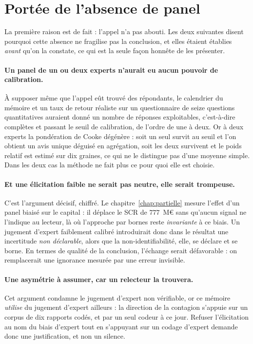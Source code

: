 \section{Portée de l'absence de panel}

La première raison est de fait : l'appel n'a pas abouti. Les deux suivantes disent pourquoi cette
absence ne fragilise pas la conclusion, et elles étaient établies \emph{avant} qu'on la constate,
ce qui est la seule façon honnête de les présenter.

\paragraph{Un panel de un ou deux experts n'aurait eu aucun pouvoir de calibration.} À supposer
même que l'appel eût trouvé des répondants, le calendrier du mémoire et un taux de retour
réaliste sur un questionnaire de seize questions quantitatives auraient donné un nombre de
réponses exploitables, c'est-à-dire complètes et passant le seuil de calibration, de l'ordre de
une à deux. Or à deux experts la pondération de Cooke dégénère : soit un
seul survit au seuil et l'on obtient un avis unique déguisé en agrégation, soit les deux
survivent et le poids relatif est estimé sur dix graines, ce qui ne le distingue pas d'une
moyenne simple. Dans les deux cas la méthode ne fait plus ce pour quoi elle est choisie.

\paragraph{Et une élicitation faible ne serait pas neutre, elle serait trompeuse.} C'est
l'argument décisif, chiffré. Le chapitre~\ref{chap:partielle} mesure l'effet d'un
panel biaisé sur le capital : il déplace le SCR de $777$~M\euro{} sans
qu'aucun signal ne l'indique au lecteur, là où l'approche par bornes reste \emph{invariante} à
ce biais. Un jugement d'expert faiblement calibré introduirait donc dans le résultat une
incertitude \emph{non déclarable}, alors que la non-identifiabilité, elle, se déclare et se
borne. En termes de qualité de la conclusion, l'échange serait défavorable : on remplacerait
une ignorance mesurée par une erreur invisible.

\paragraph{Une asymétrie à assumer, car un relecteur la trouvera.} Cet argument condamne le
jugement d'expert non vérifiable, or ce mémoire \emph{utilise} du jugement d'expert ailleurs :
la direction de la contagion s'appuie sur un corpus de dix rapports codés, et par un seul codeur
à ce jour. Refuser l'élicitation au nom du biais d'expert tout en s'appuyant sur un codage
d'expert demande donc une justification, et non un silence.

